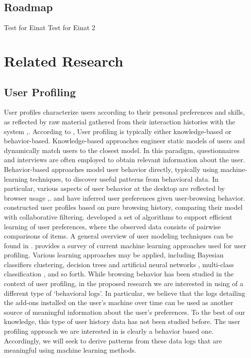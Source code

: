 \documentclass[11pt,oneside]{book}
\let\Oldsection\section
\renewcommand{\section}{\FloatBarrier\Oldsection}
\begin{document}
\section{Roadmap}
\label{sub:roadmap}
Test for Einat
Test for Einat 2



\chapter{Related Research}
\label{sec:related}


\section{User Profiling}

User profiles characterize users according to their personal
preferences and skills, as reflected by raw material gathered from
their interaction histories with the system \citep{koch2001software},\citep{gauch2007user}. According to \citep{gauch2007user}, User profiling is typically either knowledge-based or
behavior-based. Knowledge-based approaches engineer static models of
users and dynamically match users to the closest model. In this
paradigm, questionnaires and interviews are often employed to obtain
relevant information about the user. Behavior-based approaches model
user behavior directly, typically using machine-learning techniques,
to discover useful patterns from behavioral data. In particular,
various aspects of user behavior at the desktop are reflected by
browser usage \citep{benevenuto2009characterizing},\citep{bilenko11}. \citep{lieberman1995letizia} and \citep{joachims97} have inferred user preferences given user-browsing behavior. \citep{sugiyama2004adaptive} constructed user profiles based on pure browsing history,
comparing their model with collaborative filtering.  \citep{lu2011learning} developed a set of algorithms to support efficient
learning of user preferences, where the observed data consists of
pairwise comparisons of items.  A general overview of user modeling
techniques can be found in \citep{leontiadis2012don}. \citep{sebastiani02} \citep{sebastiani03} provides a survey of current machine learning
approaches used for user profiling.  Various learning approaches may
be applied, including Bayesian classifiers clustering, decision trees
and artificial neural networks \citep{pazzani97}, multi-class classification \cite{bauer2014analyzing},
and so forth.  While browsing behavior has been studied in the context
of user profiling, in the proposed research we are interested in using
of a different type of `behavioral logs'. In particular, we believe
that the logs detailing the add-ons installed on the user's machine
over time can be used as another source of meaningful information
about the user's preferences. To the best of our knowledge, this type
of user history data has not been studied before. The user profiling
approach we are interested in is clearly a behavior based
one. Accordingly, we will seek to derive patterns from these data logs
that are meaningful using machine learning methods.
\end{document}
